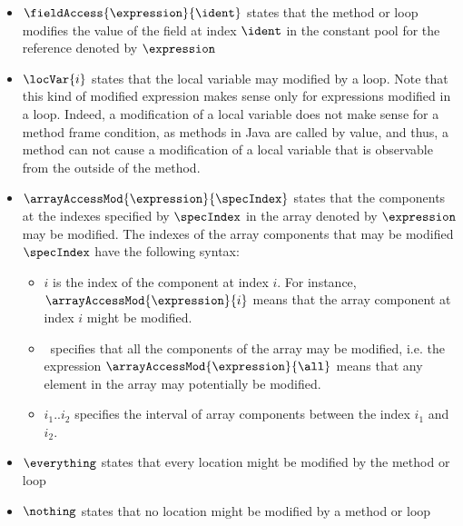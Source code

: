 \begin{itemize}
      \item  $ \fieldAccess{\expression}{\ident} $ states that the method or loop modifies the value of the field at index $\ident$ 
             in the constant pool for the reference denoted by  $\expression$ 
      \item $\locVar{i}$ states that the local variable may modified by a loop. Note that this kind of modified
            expression makes sense only for expressions modified in a loop.
	    Indeed, a modification of a local variable does not make sense for a method frame condition, 
	    as methods in Java are called by value, and
	    thus, a method can not cause a modification of a local variable that is observable from the outside of the method.
	    
      \item  $\arrayAccessMod{\expression}{\specIndex}$ states that the components at the indexes specified by $\specIndex$ in
            the array denoted by $\expression$ may be modified. The indexes of the array components that may be modified $\specIndex$
	    have the following syntax:
	    \begin{itemize}
	          \item $i$ is the index of the component at index $i$. For instance, \\
		        $\arrayAccessMod{\expression}{i}$ means that the array component at index $i$ might be modified.
	          \item \all \ specifies that all the components of the array may be modified, i.e. the expression 
		         $\arrayAccessMod{\expression}{\all}$ means that any element in the array may potentially be modified.
		       
		  \item $ i_1 .. i_2$ specifies the interval of array components between the index $i_1$  and $i_2$.  
			 
	    \end{itemize}

      \item $\everything $ states that every location might be modified by the method or loop
      \item $\nothing$ states that no location might be modified by a method or loop
\end{itemize}
